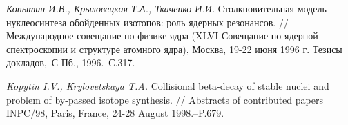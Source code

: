 \begin{thebibliography}{200}
\textit{Копытин И.В., Крыловецкая Т.А., Ткаченко И.И.} Столкновительная модель
нуклеосинтеза обойденных изотопов: роль ядерных резонансов. //
Международное совещание по физике ядра (XLVI Совещание по ядерной
спектроскопии и структуре атомного ядра), Москва, 19-22 июня
1996 г. Тезисы докладов,--С-Пб., 1996.--С.317.


\textit{Kopytin I.V., Krylovetskaya T.A.} Collisional beta-decay of stable nuclei and
problem of by-passed isotope synthesis. // Abstracts of contributed papers
INPC/98, Paris, France, 24-28 August 1998.--P.679.







\end{thebibliography}
